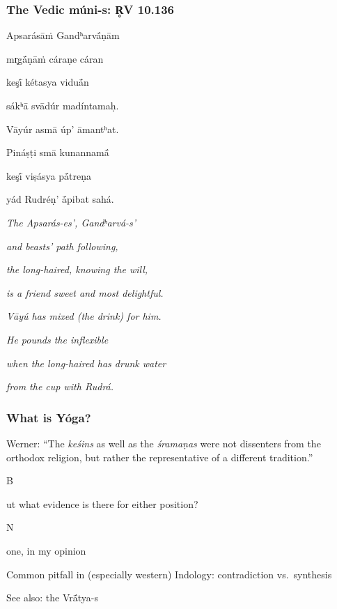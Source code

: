 \documentclass[pdf]{beamer}
\newcommand{\Subitem}[1]{{\setlength\itemindent{12pt} \item[-] #1}}
\begin{document}
\begin{frame} \frametitle{The Vedic múni-s: R̥V 10.136}
\begin{center}
\begin{multicols}{2}
\scriptsize{
	Apsarásāṁ Gandʰarvā́ṇām

	mr̥gā́ṇāṁ cáraṇe cáran

	keşī́ kétasya viduā́n

	sákʰā svādúr madíntamaḥ.

	\vspace{\baselineskip}

	Vāyúr asmā úp’ āmantʰat.

	Pináṣṭi smā kunannamā́

	keşī́ viṣásya pā́treṇa

	yád Rudréṇ’ ā́pibat sahá.
	
	\columnbreak

	\textit{The Apsarás-es', Gandʰarvá-s'}

	\textit{and beasts' path following,}

	\textit{the long-haired, knowing the will,}

	\textit{is a friend sweet and most delightful.}

	\vspace{\baselineskip}

	\textit{Vāyú has mixed (the drink) for him.}

	\textit{He pounds the inflexible}

	\textit{when the long-haired has drunk water}

	\textit{from the cup with Rudrá.}

}
\end{multicols}
\end{center}
\end{frame}

\begin{frame} \frametitle{What is Yóga?}
\begin{itemize}
	\item Werner: ``The \emph{keśins} as well as the \emph{śramaṇas} were not dissenters from the orthodox religion, but rather the representative of a different tradition.''
	\Subitem But what evidence is there for either position?
	\Subitem None, in my opinion
	\item Common pitfall in (especially western) Indology: contradiction vs.~synthesis
	\item See also: the Vrā́tya-s
\end{itemize}
\end{frame}
\end{document}
